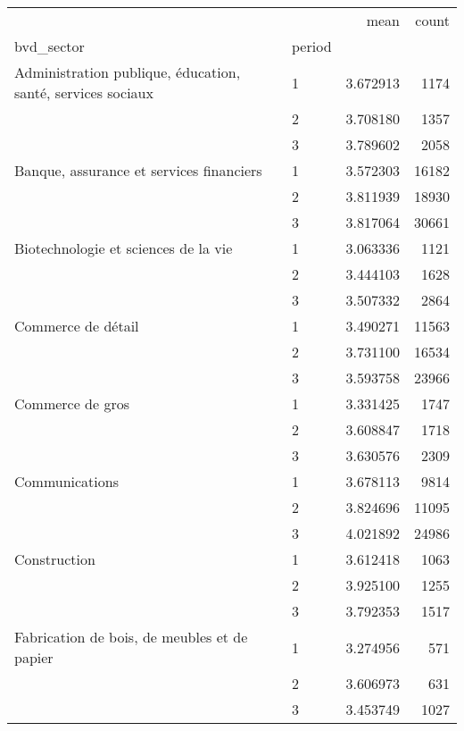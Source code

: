 \begin{tabular}{llrr}
\toprule
                             &   &      mean &  count \\
bvd\_sector & period &           &        \\
\midrule
Administration publique, éducation, santé, services sociaux & 1 &  3.672913 &   1174 \\
                             & 2 &  3.708180 &   1357 \\
                             & 3 &  3.789602 &   2058 \\
Banque, assurance et services financiers & 1 &  3.572303 &  16182 \\
                             & 2 &  3.811939 &  18930 \\
                             & 3 &  3.817064 &  30661 \\
Biotechnologie et sciences de la vie & 1 &  3.063336 &   1121 \\
                             & 2 &  3.444103 &   1628 \\
                             & 3 &  3.507332 &   2864 \\
Commerce de détail & 1 &  3.490271 &  11563 \\
                             & 2 &  3.731100 &  16534 \\
                             & 3 &  3.593758 &  23966 \\
Commerce de gros & 1 &  3.331425 &   1747 \\
                             & 2 &  3.608847 &   1718 \\
                             & 3 &  3.630576 &   2309 \\
Communications & 1 &  3.678113 &   9814 \\
                             & 2 &  3.824696 &  11095 \\
                             & 3 &  4.021892 &  24986 \\
Construction & 1 &  3.612418 &   1063 \\
                             & 2 &  3.925100 &   1255 \\
                             & 3 &  3.792353 &   1517 \\
Fabrication de bois, de meubles et de papier & 1 &  3.274956 &    571 \\
                             & 2 &  3.606973 &    631 \\
                             & 3 &  3.453749 &   1027 \\

\end{tabular}
